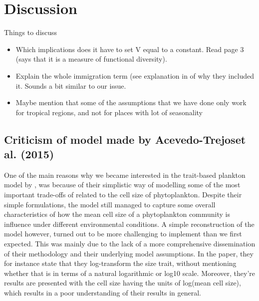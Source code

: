 \section{Discussion}
Things to discuss
\begin{itemize}
  \item Which implications does it have to set V equal to a constant. Read page 3 (says that it is a measure of functional diversity).
  \item Explain the whole immigration term (see explanation in \cite{AcevedoTrejos2015} of why they included it. Sounds a bit similar to our issue.
  \item Maybe mention that some of the assumptions that we have done only work for tropical regions, and not for places with lot of seasonality
\end{itemize}

\subsection{Criticism of model made by  Acevedo-Trejoset al. (2015)}
One of the main reasons why we became interested in the trait-based plankton model by \cite{AcevedoTrejos2015}, was because of their simplistic way of modelling some of the most important trade-offs of related to the cell size of phytoplankton. Despite their simple formulations, the model still managed to capture some overall characteristics of how the mean cell size of a phytoplankton community is influence under different environmental conditions. A simple reconstruction of the model however, turned out to be more challenging to implement than we first expected. This was mainly due to the lack of a more comprehensive dissemination of their methodology and their underlying model assumptions. In the paper, they for instance state that they log-transform the size trait, without mentioning whether that is in terms of a natural logarithmic or log10 scale. Moreover, they’re results are presented with the cell size having the units of log(mean cell size), which results in a poor understanding of their results in general. 

